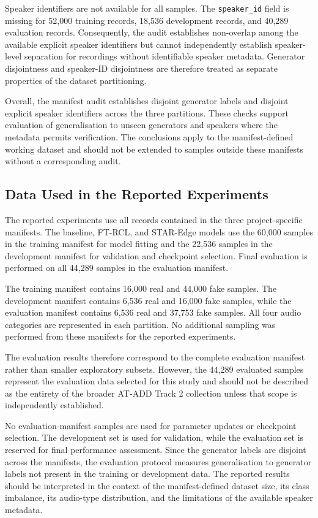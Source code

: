 \documentclass[12pt,a4paper]{report}
\begin{document}
Speaker identifiers are not available for all samples. The \texttt{speaker\_id} field is missing for 52,000 training records, 18,536 development records, and 40,289 evaluation records. Consequently, the audit establishes non-overlap among the available explicit speaker identifiers but cannot independently establish speaker-level separation for recordings without identifiable speaker metadata. Generator disjointness and speaker-ID disjointness are therefore treated as separate properties of the dataset partitioning.

Overall, the manifest audit establishes disjoint generator labels and disjoint explicit speaker identifiers across the three partitions. These checks support evaluation of generalisation to unseen generators and speakers where the metadata permits verification. The conclusions apply to the manifest-defined working dataset and should not be extended to samples outside these manifests without a corresponding audit.

\subsection{Data Used in the Reported Experiments}
\label{sec:data-used}

The reported experiments use all records contained in the three project-specific manifests. The baseline, FT-RCL, and STAR-Edge models use the 60,000 samples in the training manifest for model fitting and the 22,536 samples in the development manifest for validation and checkpoint selection. Final evaluation is performed on all 44,289 samples in the evaluation manifest.

The training manifest contains 16,000 real and 44,000 fake samples. The development manifest contains 6,536 real and 16,000 fake samples, while the evaluation manifest contains 6,536 real and 37,753 fake samples. All four audio categories are represented in each partition. No additional sampling was performed from these manifests for the reported experiments.

The evaluation results therefore correspond to the complete evaluation manifest rather than smaller exploratory subsets. However, the 44,289 evaluated samples represent the evaluation data selected for this study and should not be described as the entirety of the broader AT-ADD Track 2 collection unless that scope is independently established.

No evaluation-manifest samples are used for parameter updates or checkpoint selection. The development set is used for validation, while the evaluation set is reserved for final performance assessment. Since the generator labels are disjoint across the manifests, the evaluation protocol measures generalisation to generator labels not present in the training or development data. The reported results should be interpreted in the context of the manifest-defined dataset size, its class imbalance, its audio-type distribution, and the limitations of the available speaker metadata.
\end{document}
